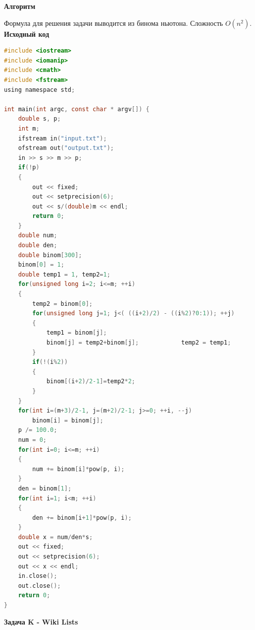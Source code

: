 \documentclass[a4paper,12pt]{article}
\begin{document}
\textbf{{\large Алгоритм}}

Формула для решения задачи выводится из бинома ньютона. Сложность $O(n^2)$. \\

\textbf{{\large Исходный код}} \\
\begin{lstlisting}[language=C]
#include <iostream>
#include <iomanip>
#include <cmath>
#include <fstream>
using namespace std;

int main(int argc, const char * argv[]) {
    double s, p;
    int m;
    ifstream in("input.txt");
    ofstream out("output.txt");
    in >> s >> m >> p;
    if(!p)
    {
        out << fixed;
        out << setprecision(6);
        out << s/(double)m << endl;
        return 0;
    }
    double num;
    double den;
    double binom[300];
    binom[0] = 1;
    double temp1 = 1, temp2=1;
    for(unsigned long i=2; i<=m; ++i)
    {
        temp2 = binom[0];
        for(unsigned long j=1; j<( ((i+2)/2) - ((i%2)?0:1)); ++j)
        {
            temp1 = binom[j];
            binom[j] = temp2+binom[j];            temp2 = temp1;
        }
        if(!(i%2))
        {
            binom[(i+2)/2-1]=temp2*2;
        }
    }
    for(int i=(m+3)/2-1, j=(m+2)/2-1; j>=0; ++i, --j)
        binom[i] = binom[j];
    p /= 100.0;
    num = 0;
    for(int i=0; i<=m; ++i)
    {
        num += binom[i]*pow(p, i);
    }
    den = binom[1];
    for(int i=1; i<m; ++i)
    {
        den += binom[i+1]*pow(p, i);
    }
    double x = num/den*s;
    out << fixed;
    out << setprecision(6);
    out << x << endl;
    in.close();
    out.close();
    return 0;
}
\end{lstlisting}

\newpage
\textbf{{\large Задача K - Wiki Lists}}
\end{document}
